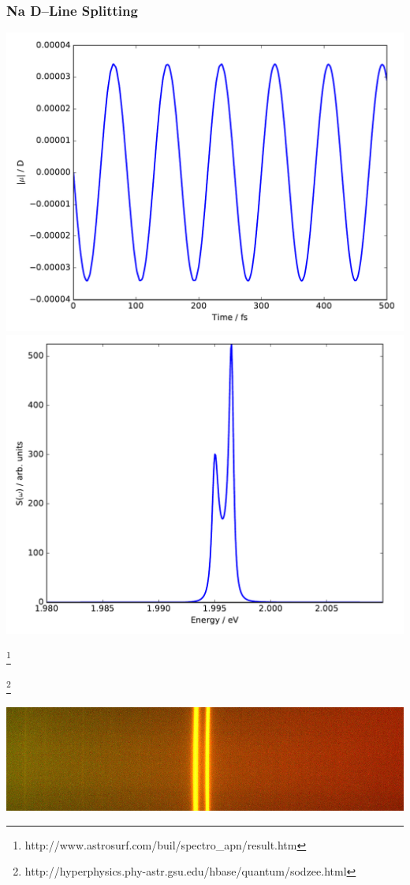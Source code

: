 \documentclass{beamer}
\newcommand\blfootnote[1]{%
  \begingroup
  \renewcommand\thefootnote{}\footnote{#1}%
  \addtocounter{footnote}{-1}%
  \endgroup
}
\begin{document}
\begin{frame}
\frametitle{Na D--Line Splitting}

\begin{minipage}[h!]{0.45\textwidth}
\includegraphics[width=\textwidth]{na_fss_dipole}\\
\includegraphics[width=\textwidth]{na_fss}
\end{minipage}
\blfootnote{http://www.astrosurf.com/buil/spectro\_apn/result.htm}
\blfootnote{http://hyperphysics.phy-astr.gsu.edu/hbase/quantum/sodzee.html}
\begin{minipage}[h!]{0.50\textwidth}

\includegraphics[width=\textwidth]{NaLines}


\end{minipage}
\end{frame}
\end{document}
